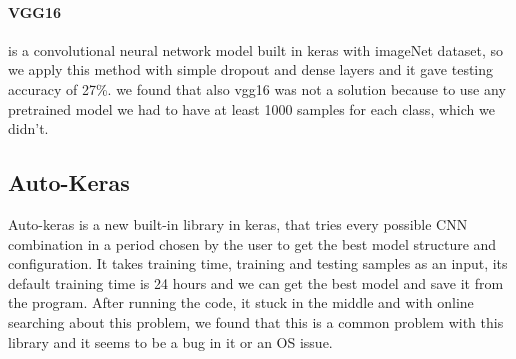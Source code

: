 \paragraph{VGG16}
is a convolutional neural network model built in keras with imageNet dataset, so we apply this method with simple dropout and dense layers and it gave testing accuracy of 27\%.
we found that also vgg16 was not a solution because to use any pretrained model we had to have at least 1000 samples for each class, which we didn't.

\subsection{Auto-Keras}
Auto-keras is a new built-in library in keras, that tries every possible CNN combination in a period chosen by the user to get the best model structure and configuration. It takes training time, training and testing samples as an input, its default training time is 24 hours and we can get the best model and save it from the program.
After running the code, it stuck in the middle and with online searching about this problem, we found that this is a common problem with this library and it seems to be a bug in it or an OS issue.

